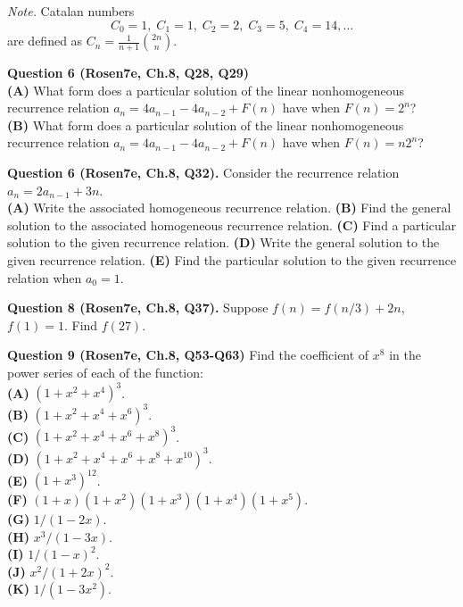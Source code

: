 \documentclass[jou]{apa6}
\begin{document}
{\em Note.} Catalan numbers 
$$C_0=1,\; C_1=1,\; C_2=2,\; C_3=5,\; C_4=14,\ldots$$
are defined as ${\displaystyle C_n = \frac{1}{n+1}{2n \choose n}}$.

\vspace{10pt}
{\bf Question 6  (Rosen7e, Ch.8, Q28, Q29)}\\
{\bf (A)} What form does a particular solution of the linear nonhomogeneous 
recurrence relation $a_n = 4a_{n-1} - 4a_{n-2} + F(n)$ have when $F(n) = 2^n$?\\
{\bf (B)} What form does a particular solution of the linear nonhomogeneous 
recurrence relation $a_n = 4a_{n-1} - 4a_{n-2} + F(n)$ have when $F(n) = n2^n$?


 

\vspace{10pt}
{\bf Question 6 (Rosen7e, Ch.8, Q32).}
Consider the recurrence relation $a_n = 2a_{n-1} + 3n$.\\
{\bf (A)} Write the associated homogeneous recurrence relation.
{\bf (B)} Find the general solution to the associated homogeneous recurrence relation.
{\bf (C)} Find a particular solution to the given recurrence relation.
{\bf (D)} Write the general solution to the given recurrence relation.
{\bf (E)} Find the particular solution to the given recurrence relation when $a_0 = 1$.


\vspace{10pt}
{\bf Question 8 (Rosen7e, Ch.8, Q37).} 
Suppose $f(n) = f(n/3) + 2n$, $f(1) = 1$. Find $f(27)$.


\vspace{10pt}
{\bf Question 9  (Rosen7e, Ch.8, Q53-Q63)} 
Find the coefficient of $x^8$ in the power series of each of the function:\\
{\bf (A)} $(1 + x^2 + x^4)^3$.\\
{\bf (B)} $(1 + x^2 + x^4 + x^6)^3$.\\
{\bf (C)} $(1 + x^2 + x^4 + x^6 + x^8)^3$.\\
{\bf (D)} $(1 + x^2 + x^4 + x^6 + x^8 + x^{10})^3$.\\
{\bf (E)} $(1 + x^3)^{12}$.\\
{\bf (F)} $(1 + x)(1 + x^2)(1 + x^3)(1 + x^4)(1 + x^5)$.\\
{\bf (G)} $1/(1 - 2x)$.\\
{\bf (H)} $x^3/(1 - 3x)$.\\
{\bf (I)} $1/(1 - x)^2$.\\
{\bf (J)} $x^2/(1 + 2x)^{2}$.\\
{\bf (K)} $1/(1 - 3x^2)$.
\end{document}
